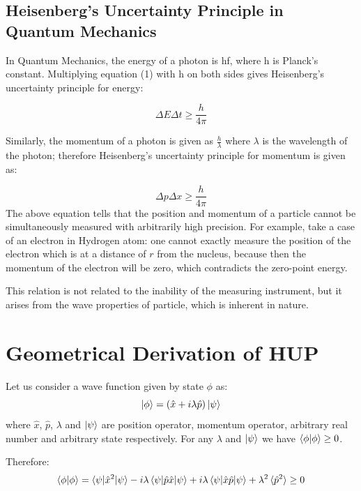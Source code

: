 \documentclass[conference]{IEEEtran}
\begin{document}
\subsection*{Heisenberg’s Uncertainty Principle in Quantum Mechanics}

In Quantum Mechanics, the energy of a photon is hf, where h is Planck's constant. Multiplying equation (1) with h on both sides gives Heisenberg's uncertainty principle for energy:

\begin{equation}
\Delta E \Delta t \geq \frac{h}{4\pi} 
\end{equation}

Similarly, the momentum of a photon is  given as $\frac{h}{\lambda}$ where $\lambda$ is the wavelength of the photon; therefore Heisenberg's uncertainty principle for momentum is given as:

\begin{equation}
\Delta p \Delta x \geq \frac{h}{4\pi} 
\end{equation}
The above equation tells that the position and momentum of a particle cannot be simultaneously measured with arbitrarily high precision. For example, take a case of an electron in Hydrogen atom: one cannot exactly measure the position of the electron which is at a distance of $r$ from the nucleus, because then the momentum of the electron will be zero, which contradicts the zero-point energy.

This relation is not related to the inability of the measuring instrument, but it arises from the wave properties of particle, which is inherent in nature.  

\section{Geometrical Derivation of HUP}
Let us consider a wave function given by state $\phi$ as:
\begin{equation}
\ket{\phi}=(\hat{x}+i\lambda\hat{p})\ket{\psi}  
\end{equation}
where $\hat{x}$, $\hat{p}$, $\lambda$ and $\ket{\psi}$ are position operator, momentum operator, arbitrary real number and arbitrary state respectively. For any $\lambda$ and $\ket{\psi}$ we have $\braket{\phi|\phi}\geq 0$. 

Therefore:
\begin{equation}
\braket{\phi|\phi}=\braket{\psi|\hat{x}^2|\psi}-i\lambda\braket{\psi|\hat{p}\hat{x}|\psi}+i\lambda\braket{\psi|\hat{x}\hat{p}|\psi}+\lambda^2\braket{\hat{p}^2}\geq 0 
\end{equation}
\end{document}
